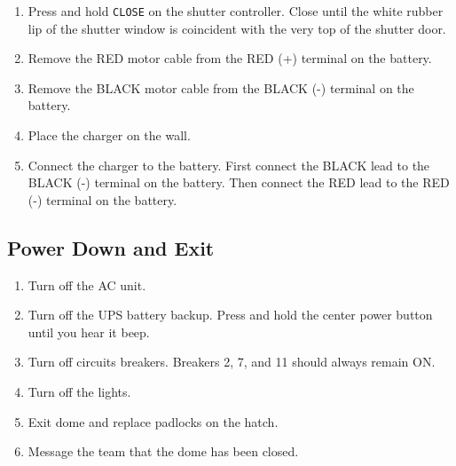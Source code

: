 \documentclass{article}
\begin{document}
	\begin{enumerate}
		
		\item Press and hold \texttt{CLOSE} on the shutter controller. Close until the white rubber lip of the shutter window is coincident with the very top of the shutter door.
		
		\item Remove the RED motor cable from the RED (+) terminal on the battery.
		
		\item Remove the BLACK motor cable from the BLACK (-) terminal on the battery.
		
		\item Place the charger on the wall.
		
		\item Connect the charger to the battery. First connect the BLACK lead to the BLACK (-) terminal on the battery. Then connect the RED lead to the RED (-) terminal on the battery.
		
	\end{enumerate}
	
	\subsection{Power Down and Exit}
	
	\begin{enumerate}
		
		\item Turn off the AC unit.
		
		\item Turn off the UPS battery backup. Press and hold the center power button until you hear it beep.
		
		\item Turn off circuits breakers. Breakers 2, 7, and 11 should always remain ON.
		
		\item Turn off the lights.
		
		\item Exit dome and replace padlocks on the hatch.
		
		\item Message the team that the dome has been closed.
		
	\end{enumerate}
	
\end{document}
